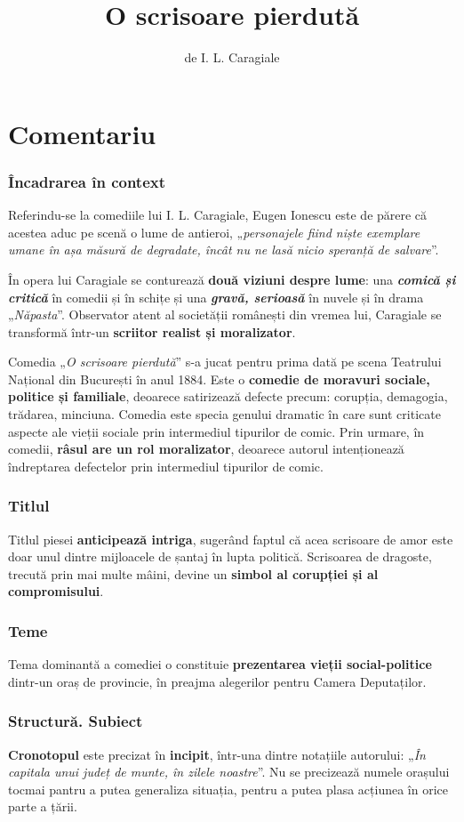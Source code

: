 \documentclass{article}
\title{O scrisoare pierdută}
\author{de I. L. Caragiale}
\date{}
\newcommand{\qu}[1]{„\emph{#1}”}
\begin{document}
\maketitle

\part*{Comentariu}
\section{Încadrarea în context}
Referindu-se la comediile lui I. L. Caragiale, Eugen Ionescu este de părere că acestea aduc pe scenă o lume de antieroi, \qu{personajele fiind niște exemplare umane în așa măsură de degradate, încât nu ne lasă nicio speranță de salvare}.

În opera lui Caragiale se conturează \textbf{două viziuni despre lume}: una \textsl{\textbf{comică și critică}} în comedii și în schițe și una \textsl{\textbf{gravă, serioasă}} în nuvele și în drama \qu{Năpasta}. Observator atent al societății românești din vremea lui, Caragiale se transformă într-un \textbf{scriitor realist și moralizator}.

Comedia \qu{O scrisoare pierdută} s-a jucat pentru prima dată pe scena Teatrului Național din București în anul 1884. Este o \textbf{comedie de moravuri sociale, politice și familiale}, deoarece satirizează defecte precum: corupția, demagogia, trădarea, minciuna. Comedia este specia genului dramatic în care sunt criticate aspecte ale vieții sociale prin intermediul tipurilor de comic. Prin urmare, în comedii, \textbf{râsul are un rol moralizator}, deoarece autorul intenționează îndreptarea defectelor prin intermediul tipurilor de comic.
\section{Titlul}
Titlul piesei \textbf{anticipează intriga}, sugerând faptul că acea scrisoare de amor este doar unul dintre mijloacele de șantaj în lupta politică. Scrisoarea de dragoste, trecută prin mai multe mâini, devine un \textbf{simbol al corupției și al compromisului}.
\section{Teme}
Tema dominantă a comediei o constituie \textbf{prezentarea vieții social-politice} dintr-un oraș de provincie, în preajma alegerilor pentru Camera Deputaților.
\section{Structură. Subiect}
\textbf{Cronotopul} este precizat în \textbf{incipit}, într-una dintre notațiile autorului: \qu{În capitala unui județ de munte, în zilele noastre}. Nu se precizează numele orașului tocmai pantru a putea generaliza situația, pentru a putea plasa acțiunea în orice parte a țării.
\end{document}
